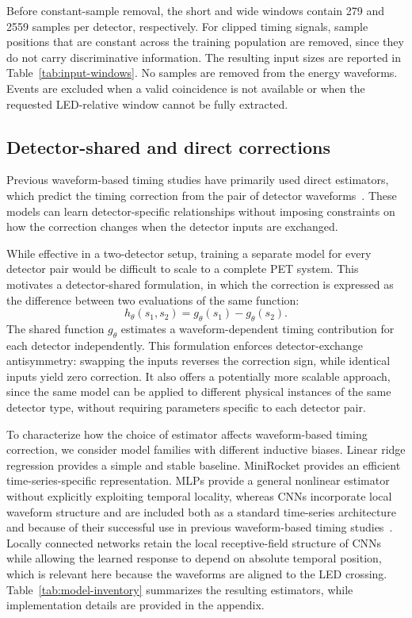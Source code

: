 Before constant-sample removal, the short and wide windows contain
279 and 2559 samples per detector, respectively. For clipped timing
signals, sample positions that are constant across the training
population are removed, since they do not carry discriminative
information. The resulting input sizes are reported in
Table~\ref{tab:input-windows}. No samples are removed from the energy
waveforms. Events are excluded when a valid coincidence is not
available or when the requested LED-relative window cannot be fully
extracted.



\subsection{Detector-shared and direct corrections}

Previous waveform-based timing studies have primarily used direct
estimators, which predict the timing correction from the pair of
detector waveforms~\cite{berg2018,onishi2022}. These models can
learn detector-specific relationships without imposing constraints
on how the correction changes when the detector inputs are exchanged.

While effective in a two-detector setup, training a separate model
for every detector pair would be difficult to scale to a complete
PET system. This motivates a detector-shared formulation, in which
the correction is expressed as the difference between two evaluations
of the same function:
\begin{equation}
h_\theta(s_1,s_2)=g_\theta(s_1)-g_\theta(s_2).
\label{eq:shared}
\end{equation}
The shared function $g_\theta$ estimates a waveform-dependent
timing contribution for each detector independently. This formulation
enforces detector-exchange antisymmetry: swapping the inputs
reverses the correction sign, while identical inputs yield zero
correction. It also offers a potentially more scalable approach, 
since the same model can be applied to different physical instances 
of the same detector type, without requiring parameters specific 
to each detector pair.

To characterize how the choice of estimator affects waveform-based timing
correction, we consider model families with different inductive biases.
Linear ridge regression provides a simple and stable baseline. 
MiniRocket provides an efficient time-series-specific representation. 
MLPs provide a general nonlinear estimator
without explicitly exploiting temporal locality, whereas CNNs incorporate
local waveform structure and are included both as a standard time-series
architecture and because of their successful use in previous waveform-based
timing studies~\cite{onishi2022,loignon2025}. Locally connected networks
retain the local receptive-field structure of CNNs while allowing the learned
response to depend on absolute temporal position, which is relevant here
because the waveforms are aligned to the LED crossing.
Table~\ref{tab:model-inventory} summarizes the resulting estimators, while
implementation details are provided in the appendix.


